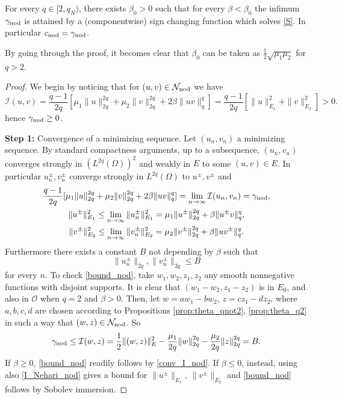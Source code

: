 \documentclass[reqno]{amsart}
\begin{document}
\begin{theorem}\label{thm:existence_ nodal}
For every $q\in [2,q_N)$, there exists $\beta_0>0$ such that  for every
$\beta < \beta_0$ the infimum $\gamma_{\rm nod}$
is attained by a (componentwise) sign changing function which solves \eqref{S}.
In particular $c_{\rm nod}=\gamma_{\rm nod}$.
\end{theorem}

By going through the proof, it becomes clear that $\beta_0$  can be taken as
$\frac{1}2\sqrt{\mu_1\mu_2}$ for $q>2$.

\begin{proof}
We begin by noticing that for $(u,v)\in \mathcal N_{\rm nod}$ we have
 \begin{equation} \label{I_Nehari_nod}
 \mathcal I(u,v)=\frac{q-1}{2q}\left[ \mu_1 \|u\|_{2q}^{2q}
 + \mu_2\|v\|_{2q}^{2q}  +2\beta \|uv\|_q^q \right]
 = \frac{q-1}{2q}\left[  \|u\|_{E_1}^{2} + \|v\|_{E_2}^{2} \right]  >0.
 \end{equation}
hence $\gamma_{\rm nod}\ge 0$.
\smallskip

\noindent\textbf{Step 1:} Convergence of a minimizing sequence.
Let $(u_n,v_n)$ a minimizing sequence. By standard compactness arguments, up to a
subsequence,  $(u_n,v_n)$ converges strongly in $(L^{2q}(\Omega))^2$ and weakly in $E$
to some  $(u,v) \in E$.
 In particular $u^{\pm}_n, v^{\pm}_n$ converge strongly in $L^{2q}(\Omega) $ to
 $u^{\pm}, v^{\pm}$ and
\begin{gather}
  \label{conv_I_nod}
  \frac{q-1}{2q}[ \mu_1 \|u\|_{2q}^{2q} + \mu_2\|v\|_{2q}^{2q}
  +2\beta \|uv\|_q^q]
= \lim_{n\to\infty} \mathcal I(u_n,v_n) =\gamma_{\rm nod} ,\\
\label{Fatou1}
  \|u^{\pm}\|_{E_1}^2 \le \lim_{n\to\infty} \|u^{\pm}_n\|_{E_1}^2
  =    \mu_1 \|u^{\pm}\|_{2q}^{2q} + \beta \|u^{\pm}v\|_q^q , \\
\label{Fatou2}
  \|v^{\pm}\|_{E_2}^2 \le \lim_{n\to\infty} \|v^{\pm}_n\|_{E_2}^2 =
 \mu_2 \|v^{\pm}\|_{2q}^{2q} + \beta \|uv^{\pm}\|_q^q .
 \end{gather}
Furthermore there exists a constant $B$ not depending by $\beta$ such that
\begin{equation}\label{bound_nod}
  \|u^{\pm}_n\|_{2q}, \|v^{\pm}_n\|_{2q}\le B
\end{equation}
for every $n$.
To check \eqref{bound_nod}, take $w_1, w_2, z_1, z_2$ any smooth nonnegative functions
with disjoint supports.
It is clear that  $(w_1-w_2, z_1-z_2)$ is in $E_0$, and also in $\mathcal O$ when
$q=2$ and $\beta>0$. Then, let  $w=aw_1-bw_2$, $z=cz_1-dz_2$, where $a,b,c,d$ are
chosen according to Propositions \ref{prop:theta_qnot2}, \ref{prop:theta_q2} in such
a way that $(w,z)\in\mathcal N_{\rm nod}$. So
 \[
\gamma_{\rm nod} \le \mathcal I(w,z)
= \frac{1}2\|(w,z) \|_E^2 - \frac{\mu_1}{2q}\|w\|_{2q}^{2q} -
 \frac{\mu_2}{2q}\|z\|_{2q}^{2q} =B.
 \]
If $\beta \ge 0$, \eqref{bound_nod} readily  follows by  \eqref{conv_I_nod}.
If $\beta \le 0$, instead, using also \eqref{I_Nehari_nod} gives a bound for
$\|u^{\pm}\|_{E_1}$, $\|v^{\pm}\|_{E_2}$ and  \eqref{bound_nod} follows by
Sobolev immersion.
\smallskip


\end{proof}
\end{document}
